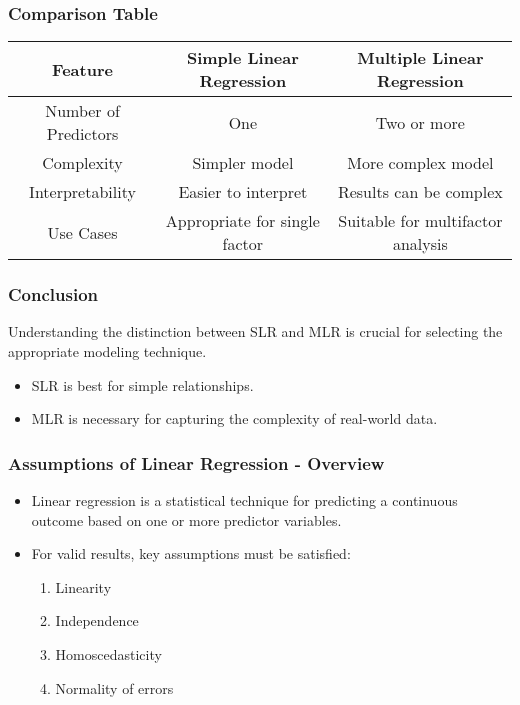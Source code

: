 \documentclass[aspectratio=169]{beamer}
\begin{document}
\begin{frame}[fragile]
    \frametitle{Comparison Table}
    \begin{tabular}{|c|c|c|}
        \hline
        Feature & Simple Linear Regression & Multiple Linear Regression \\
        \hline
        Number of Predictors & One & Two or more \\
        \hline
        Complexity & Simpler model & More complex model \\
        \hline
        Interpretability & Easier to interpret & Results can be complex \\
        \hline
        Use Cases & Appropriate for single factor & Suitable for multifactor analysis \\
        \hline
    \end{tabular}
\end{frame}

\begin{frame}[fragile]
    \frametitle{Conclusion}
    Understanding the distinction between SLR and MLR is crucial for selecting the appropriate modeling technique. 
    \begin{itemize}
        \item SLR is best for simple relationships.
        \item MLR is necessary for capturing the complexity of real-world data.
    \end{itemize}
\end{frame}

\begin{frame}[fragile]
    \frametitle{Assumptions of Linear Regression - Overview}
    \begin{itemize}
        \item Linear regression is a statistical technique for predicting a continuous outcome based on one or more predictor variables.
        \item For valid results, key assumptions must be satisfied:
            \begin{enumerate}
                \item Linearity
                \item Independence
                \item Homoscedasticity
                \item Normality of errors
            \end{enumerate}
    \end{itemize}
\end{frame}
\end{document}
